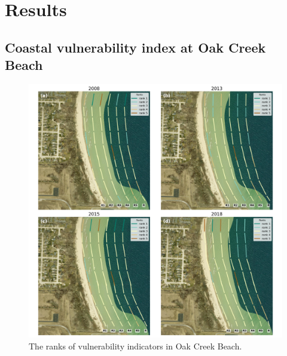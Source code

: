 \section{Results}
\label{c5_Results}

\subsection{Coastal vulnerability index at Oak Creek Beach}
\label{Coastal vulnerability index at Oak Creek Beach}

\begin{figure}[htbp]
  \centering
  \includegraphics[width=1\textwidth]{chapter5/resources/site1_cvi.png}
  \caption{The ranks of vulnerability indicators in Oak Creek Beach.}
  \label{fig:s1_cv1}
\end{figure}


